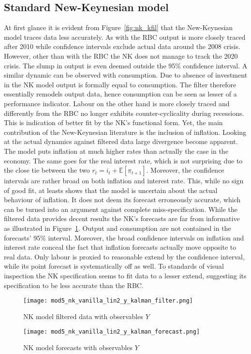 \documentclass[12pt,a4paper,english]{article} %
\newcommand{\E}{\mathbb{E}} %
\begin{document}
	\subsection{Standard New-Keynesian model}
	At first glance it is evident from Figure~\ref{fig:nk_kfil} that the New-Keynesian model traces data less accurately. As with the RBC output is more closely traced after 2010 while confidence intervals exclude actual data around the 2008 crisis. However, other than with the RBC the NK does not manage to track the 2020 crisis. The slump in output is even deemed outside the 95\% confidence interval. A similar dynamic can be observed with consumption. Due to absence of investment in the NK model output is formally equal to consumption. The filter therefore essentially remodels output data, hence consumption can be seen as lesser of a performance indicator. Labour on the other hand is more closely traced and differently from the RBC no longer exhibits counter-cyclicality during recessions. This is indication of better fit by the NK's functional form. Yet, the main contribution of the New-Keynesian literature is the inclusion of inflation. Looking at the actual dynamics against filtered data large divergence become apparent. The model puts inflation at much higher rates than actually the case in the economy. The same goes for the real interest rate, which is not surprising due to the close tie between the two $r_t = i_t + \E[\pi_{t+1}]$. Moreover, the confidence intervals are rather broad on both inflation and interest rate. This, while no sign of good fit, at leasts shows that the model is uncertain about the actual behaviour of inflation. It does not deem its forecast erroneously accurate, which can be turned into an argument against complete miss-specification.		
	While the filtered data provides decent results the NK's forecasts are far from informative as illustrated in Figure~\ref{fig:nk_kfor}. Output and consumption are not contained in the forecasts' 95\% interval. Moreover, the broad confidence intervals on inflation and interest rate conceal the fact that inflation forecasts actually move opposite to real data. Only labour is proxied to reasonable extend by the confidence interval, while its point forecast is systematically off as well. To standards of visual inspection the NK specification seems to fit data to a lesser extend, suggesting its specification to be less accurate than the RBC. 
	\begin{figure}[H]
		\begin{center}
			\texttt{[image: mod5\_nk\_vanilla\_lin2\_y\_kalman\_filter.png]}
			\caption{NK model filtered data with observables $Y$}\label{fig:nk_kfil}
			\texttt{[image: mod5\_nk\_vanilla\_lin2\_y\_kalman\_forecast.png]}
			\caption{NK model forecasts with observables $Y$}\label{fig:nk_kfor}
		\end{center}
	\end{figure}
		
\end{document}
